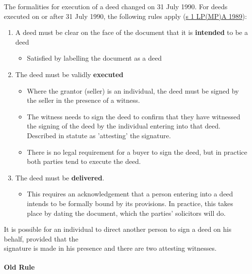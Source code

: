 \documentclass[
]{article}
\providecommand{\tightlist}{%
  \setlength{\itemsep}{0pt}\setlength{\parskip}{0pt}}
\begin{document}
The formalities for execution of a deed changed on 31 July 1990. For
deeds executed on or after 31 July 1990, the following rules apply
(\href{https://www.legislation.gov.uk/ukpga/1989/34/section/1}{s 1
LP(MP)A 1989}):

\begin{enumerate}
\tightlist
\item
  A deed must be clear on the face of the document that it is
  \textbf{intended} to be a deed

  \begin{itemize}
  \tightlist
  \item
    Satisfied by labelling the document as a deed
  \end{itemize}
\item
  The deed must be validly \textbf{executed}

  \begin{itemize}
  \tightlist
  \item
    Where the grantor (seller) is an individual, the deed must be signed
    by the seller in the presence of a witness.
  \item
    The witness needs to sign the deed to confirm that they have
    witnessed the signing of the deed by the individual entering into
    that deed. Described in statute as 'attesting' the signature.
  \item
    There is no legal requirement for a buyer to sign the deed, but in
    practice both parties tend to execute the deed.
  \end{itemize}
\item
  The deed must be \textbf{delivered}.

  \begin{itemize}
  \tightlist
  \item
    This requires an acknowledgement that a person entering into a deed
    intends to be formally bound by its provisions. In practice, this
    takes place by dating the document, which the parties' solicitors
    will do.
  \end{itemize}
\end{enumerate}

It is possible for an individual to direct another person to sign a deed
on his behalf, provided that the\\
signature is made in his presence and there are two attesting witnesses.

\hypertarget{old-rule}{%
\paragraph{Old Rule}\label{old-rule}}
\end{document}
